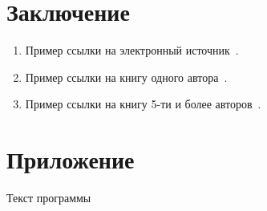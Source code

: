 \documentclass[14pt, oneside]{altsu-report}
\begin{document}
\chapter*{Заключение}

\begin{enumerate}
\item Пример ссылки на электронный источник~\cite{wikiRUBitbucket,wikiRUIdSoftware,wikiRUGitHub}.
\item Пример ссылки на книгу одного автора~\cite{book1author}.
\item Пример ссылки на книгу 5-ти и более авторов~\cite{book5author}.
\end{enumerate}

\newpage
{}
\printbibliography[title={Список использованной литературы}]

\appendix
\newpage
\chapter*{\raggedleft\label{appendix1}Приложение}

\begin{center}
\label{code:appendix}Текст программы
\end{center}

\begin{code}
\vspace{-1cm}\inputminted{C}{src/pi-mpi.c}
\end{code}
\end{document}
